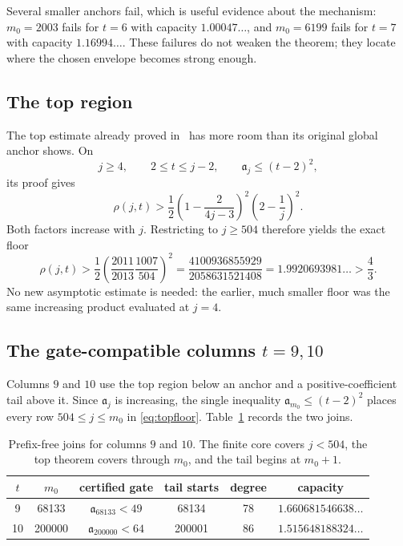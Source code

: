 \documentclass[11pt,a4paper]{article}
\theoremstyle{plain}
\theoremstyle{remark}
\newcommand{\level}{\mathfrak a}
\begin{document}
Several smaller anchors fail, which is useful evidence about the mechanism:
$m_0=2003$ fails for $t=6$ with capacity $1.00047\ldots$, and $m_0=6199$
fails for $t=7$ with capacity $1.16994\ldots$.  These failures do not weaken
the theorem; they locate where the chosen envelope becomes strong enough.

\subsection{The top region}

The top estimate already proved in~\cite{squaretail} has more room than its
original global anchor shows.  On
\[
 j\ge4,\qquad 2\le t\le j-2,\qquad \level_j\le(t-2)^2,
\]
its proof gives
\begin{equation}\label{eq:topchain}
 \rho(j,t)>
 \frac12\left(1-\frac2{4j-3}\right)^2
             \left(2-\frac1j\right)^2.
\end{equation}
Both factors increase with $j$.  Restricting to $j\ge504$ therefore yields
the exact floor
\begin{equation}\label{eq:topfloor}
 \rho(j,t)>
 \frac12\left(\frac{2011}{2013}\frac{1007}{504}\right)^2
 =\frac{4100936855929}{2058631521408}
 =1.9920693981\ldots>\frac43.
\end{equation}
No new asymptotic estimate is needed: the earlier, much smaller floor was the
same increasing product evaluated at $j=4$.

\subsection{The gate-compatible columns \texorpdfstring{$t=9,10$}{t=9,10}}

Columns $9$ and $10$ use the top region below an anchor and a
positive-coefficient tail above it.  Since $\level_j$ is increasing, the
single inequality $\level_{m_0}\le(t-2)^2$ places every row
$504\le j\le m_0$ in \eqref{eq:topfloor}.  Table~\ref{tab:ceiling} records the
two joins.

\begin{table}[ht]
\centering
\caption{Prefix-free joins for columns $9$ and $10$.  The finite core covers
$j<504$, the top theorem covers through $m_0$, and the tail begins at
$m_0+1$.}\label{tab:ceiling}
\begin{tabular}{@{}cccccc@{}}
\toprule
$t$ & $m_0$ & certified gate & tail starts & degree & capacity\\
\midrule
9 & 68133 & $\level_{68133}<49$ & 68134 & 78 & $1.660681546638\ldots$\\
10 & 200000 & $\level_{200000}<64$ & 200001 & 86 & $1.515648188324\ldots$\\
\bottomrule
\end{tabular}
\end{table}
\end{document}

